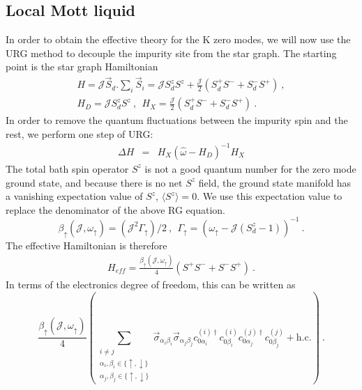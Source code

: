 \documentclass[reprint,prb,superscriptaddress]{revtex4-2}
\begin{document}
\subsection{Local Mott liquid}
\label{sec:loc_mott_liquid}
In order to obtain the effective theory for the K zero modes, we will now use the URG method to decouple the impurity site from the star graph. The starting point is the star graph Hamiltonian
\begin{gather}
H = {\mathcal{J}} \vec{S}_d.\displaystyle\sum_i \vec{S}_i ={\mathcal{J}} S_d^zS^z + \frac{{\mathcal{J}}}{2} (S_d^+S^-+ S_d^-S^+) ~,\nonumber\\
H_D = {\mathcal{J}} S^z_d S^z~,~~ H_X = \frac{{\mathcal{J}}}{2} (S_d^+S^-+ S_d^-S^+)~.
\end{gather}
In order to remove the quantum fluctuations between the impurity spin and the rest, we perform one step of URG:
\begin{eqnarray}
\Delta H &=& H_X ({\hat{\omega}-H_D})^{-1} H_X 
\end{eqnarray}
The total bath spin operator \(S^z\) is not a good quantum number for the zero mode ground state, and because there is no net $S^z$ field, the ground state manifold has a vanishing expectation value of $S^z$, $\langle S^z \rangle=0$. We use this expectation value to replace the denominator of the above RG equation.
\begin{equation}
\beta_{\uparrow} ({\mathcal{J}},\omega_{\uparrow}) = ({\mathcal{J}}^2 \Gamma_{\uparrow})/2 ~,~~\Gamma_{\uparrow}=(\omega_{\uparrow}-{\mathcal{J}}(S_d^z-1))^{-1}~.
\end{equation}
The effective Hamiltonian is therefore
\begin{eqnarray}
H_{eff} 
 =\frac{\beta_{\uparrow}({\mathcal{J}},\omega_{\uparrow})}{4} (S^+S^-+S^-S^+)   ~.
\end{eqnarray}
In terms of the electronics degree of freedom, this can be written as
\begin{equation}
\frac{ \beta_{\uparrow}({\mathcal{J}},\omega_{\uparrow}) }{4}  \left( \displaystyle\sum_{\substack{i\neq j \\ \alpha_i,\beta_i\in \{\uparrow,\downarrow\}\\ \alpha_j,\beta_j\in \{\uparrow,\downarrow\}}}\vec{\sigma}_{\alpha_i\beta_i}\vec{\sigma}_{\alpha_j\beta_j}  c_{0\alpha_i}^{(i)\dagger}  c_{0\beta_i}^{(i)}    c_{0\alpha_j}^{(j)\dagger}  c_{0\beta_j}^{(j)} +\textrm{h.c.}\right) ~.
\label{eq:all-to-all_1}
\end{equation}
\end{document}

